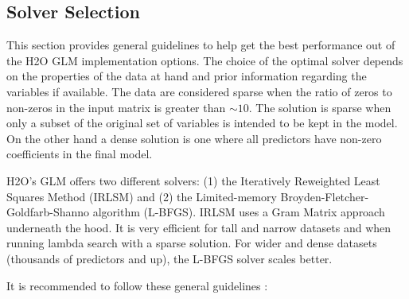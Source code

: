 \subsection{Solver Selection}

This section provides general guidelines to help get the best performance out of the H2O GLM implementation options. The choice of the optimal solver depends on the properties of the data at hand and prior information regarding the variables if available. The data are considered sparse when the ratio of zeros to non-zeros in the input matrix is greater than $\sim 10$. The solution is sparse when only a subset of the original set of variables is intended to be kept in the model. On the other hand a dense solution is one where all predictors have non-zero coefficients in the final model.

H2O's GLM offers two different solvers: (1) the Iteratively Reweighted Least Squares Method (IRLSM) and (2) the Limited-memory Broyden-Fletcher-Goldfarb-Shanno algorithm (L-BFGS). IRLSM uses
a Gram Matrix approach underneath the hood. It is very efficient for tall and narrow datasets and when running lambda search with a sparse solution.  For wider and dense
datasets (thousands of predictors and up), the L-BFGS solver scales better. 

 It is recommended to follow these general guidelines :

